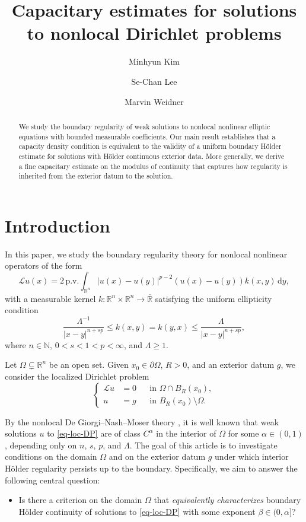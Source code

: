 \documentclass[11pt]{amsart}
\title{Capacitary estimates for solutions to nonlocal Dirichlet problems}
\author{Minhyun Kim}
\author{Se-Chan Lee}
\author{Marvin Weidner}
\theoremstyle{plain}
\theoremstyle{definition}
\numberwithin{equation}{section}
\newcommand{\R}{\mathbb{R}}
\begin{document}
\begin{abstract}
We study the boundary regularity of weak solutions to nonlocal nonlinear elliptic equations with bounded measurable coefficients. Our main result establishes that a capacity density condition is equivalent to the validity of a uniform boundary H\"older estimate for solutions with H\"older continuous exterior data. More generally, we derive a fine capacitary estimate on the modulus of continuity that captures how regularity is inherited from the exterior datum to the solution.
\end{abstract}

\maketitle

\section{Introduction}

In this paper, we study the boundary regularity theory for nonlocal nonlinear operators of the form
\begin{equation}\label{eq-L}
\mathcal{L}u(x) = 2\,\mathrm{p.v.} \int_{\mathbb{R}^n} |u(x)-u(y)|^{p-2} (u(x)-u(y)) k(x, y) \,\mathrm{d}y,
\end{equation}
with a measurable kernel $k: \mathbb{R}^n \times \mathbb{R}^n \to \overline{\mathbb{R}}$ satisfying the uniform ellipticity condition
\begin{equation}\label{eq-k}
\frac{\Lambda^{-1}}{|x-y|^{n+sp}} \leq k(x, y) = k(y, x) \leq \frac{\Lambda}{|x-y|^{n+sp}},
\end{equation}
where $n \in \mathbb{N}$, $0<s<1<p<\infty$, and $\Lambda \geq 1$.

Let $\Omega \subsetneq \R^n$ be an open set. Given $x_0 \in \partial \Omega$, $R>0$, and an exterior datum $g$, we consider the localized Dirichlet problem
\begin{equation}\label{eq-loc-DP}
\left\{
\begin{aligned}
\mathcal{L}u &=0 &&\text{in }\Omega \cap B_R(x_0), \\
u &=g &&\text{in } B_R(x_0) \setminus \Omega.
\end{aligned}
\right.
\end{equation}

By the nonlocal De Giorgi--Nash--Moser theory \cite{DCKP14,DCKP16,Kas09}, it is well known that weak solutions $u$ to \eqref{eq-loc-DP} are of class $C^{\alpha}$ in the interior of $\Omega$ for some $\alpha \in (0,1)$, depending only on $n$, $s$, $p$, and $\Lambda$. The goal of this article is to investigate conditions on the domain $\Omega$ and on the exterior datum $g$ under which interior H\"older regularity persists up to the boundary. Specifically, we aim to answer the following central question:
\begin{itemize}
    \item[(i)] Is there a criterion on the domain $\Omega$ that \textit{equivalently characterizes} boundary H\"older continuity of solutions to \eqref{eq-loc-DP} with some exponent $\beta \in (0,\alpha]$?
\end{itemize}
\end{document}
